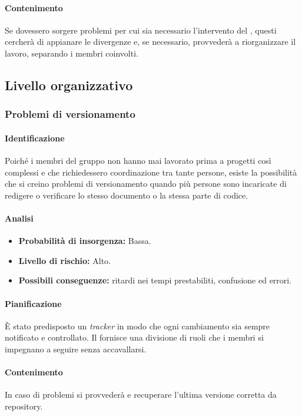 \paragraph {Contenimento}
Se dovessero sorgere problemi per cui sia necessario l'intervento del \RdP{}, questi cercherà di appianare le divergenze e, se necessario, provvederà a riorganizzare il lavoro, separando i membri coinvolti.

\subsection{Livello organizzativo}
\subsubsection{Problemi di versionamento}
\paragraph {Identificazione}
Poiché i membri del gruppo non hanno mai lavorato prima a progetti così complessi e che richiedessero coordinazione tra tante persone, esiste la possibilità che si creino problemi di versionamento quando più persone sono incaricate di redigere o verificare lo stesso documento o la stessa parte di codice.

\paragraph {Analisi}
\begin{itemize}
	\item \textbf{Probabilità di insorgenza:} Bassa.
	\item \textbf{Livello di rischio:} Alto.
	\item \textbf{Possibili conseguenze:} ritardi nei tempi prestabiliti, confusione ed errori.
\end{itemize}

\paragraph {Pianificazione}
È stato predisposto un \emph{tracker} in modo che ogni cambiamento sia sempre notificato e controllato. Il \RdP{} fornisce una divisione di ruoli che i membri si impegnano a seguire senza accavallarsi.

\paragraph {Contenimento}
In caso di problemi si provvederà e recuperare l'ultima versione corretta da repository.

